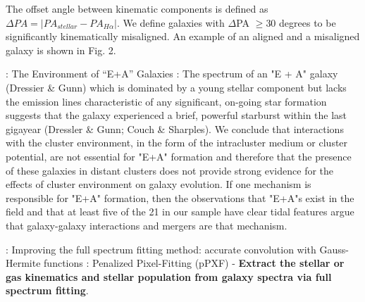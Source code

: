 \documentclass[ceqn,usenatbib,onecolumn]{mnras}
\begin{document}
The offset angle between kinematic components is defined as  $\Delta{PA}=|PA_{stellar}−PA_{H\alpha}|$.
We define galaxies with $\Delta$PA $\ge 30$ degrees to be significantly kinematically misaligned. An example of an aligned and a misaligned galaxy is shown in Fig. 2.
\par \citet{1996ApJ...466..104Z} : {The Environment of ``E+A'' Galaxies} : The spectrum of an "E + A" galaxy (Dressier \& Gunn) which is dominated by a young stellar component but lacks the emission lines characteristic of any significant, on-going star formation suggests that the galaxy experienced a brief, powerful starburst within the last gigayear (Dressler \& Gunn; Couch \& Sharples). We conclude that interactions with the cluster environment, in the form of the intracluster medium or cluster potential, are not essential for "E+A" formation and therefore that the presence of these galaxies in distant clusters does not provide strong evidence for the effects of cluster environment on galaxy evolution. If one mechanism is responsible for "E+A" formation, then the observations that "E+A"s exist in the field and that at least five of the 21 in our sample have clear tidal features argue that galaxy-galaxy interactions and mergers are that mechanism. 
\par \citet{2017MNRAS.466..798C} : {Improving the full spectrum fitting method: accurate convolution with Gauss-Hermite functions} : Penalized Pixel-Fitting (pPXF) - \textbf{Extract the stellar or gas kinematics and stellar population from galaxy spectra via full spectrum fitting}.
\end{document}
